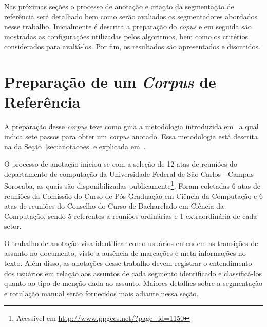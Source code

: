 Nas próximas seções o processo de anotação e criação da segmentação de referência será detalhado bem como serão avaliados os segmentadores abordados nesse trabalho. Inicialmente é descrita a preparação do \textit{copus} e em seguida são mostradas as configurações utilizadas pelos algoritmos, bem como os critérios considerados para avaliá-los. Por fim, os resultados são apresentados e discutidos.




\section{Preparação de um \textit{Corpus} de Referência}
\label{sec:preparacaocorpusreferencia}



A preparação desse \textit{corpus} teve como guia a metodologia introduzida em~\cite{Hovy2010} a qual indica sete passos para obter um \textit{corpus} anotado. Essa metodologia está descrita na da Seção~\ref{sec:anotacoes} e explicada em~\cite{Cardoso2017}. 



O processo de anotação iniciou-se com a seleção de 12 atas de reuniões do departamento de computação da Universidade Federal de São Carlos - Campus Sorocaba, as quais são disponibilizadas publicamente\footnote{Acessível em  \url{http://www.ppgccs.net/?page\_id=1150}}. Foram coletadas 6 atas de reuniões da Comissão do Curso de Pós-Graduação em Ciência da Computação e 6 atas de reuniões do Conselho do Curso de Bacharelado em Ciência da Computação, sendo 5 referentes a reuniões ordinárias e 1 extraordinária de cada setor.

O trabalho de anotação visa identificar como usuários entendem as transições de assunto no documento, visto a ausência de marcações e meta informações no texto. Além disso, as anotações desse trabalho devem registrar o entendimento dos usuários em relação aos assuntos de cada segmento identificado e classificá-los quanto ao tipo de menção dada ao assunto. Maiores detalhes sobre a segmentação e rotulação manual serão fornecidos mais adiante nessa seção.


